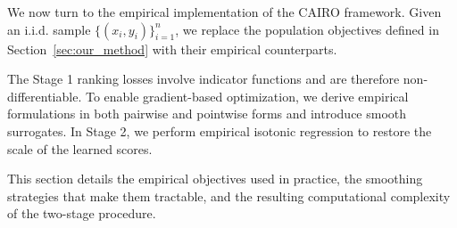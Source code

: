 \documentclass[11pt]{article}
\theoremstyle{plain}
\theoremstyle{plain}
\theoremstyle{plain}
\theoremstyle{plain}
\theoremstyle{plain}
\theoremstyle{plain}
\theoremstyle{plain}
\begin{document}
We now turn to the empirical implementation of the \textsc{CAIRO} framework. Given an i.i.d. sample $\{(x_i, y_i)\}_{i=1}^n$,  we replace the population objectives defined in Section~\ref{sec:our_method} with their empirical counterparts.

The Stage 1 ranking losses involve indicator functions and are therefore non-differentiable. To enable gradient-based optimization, we derive empirical formulations in both pairwise and pointwise forms and introduce smooth surrogates. In Stage 2, we perform empirical isotonic regression to restore the scale of the learned scores.

This section details the empirical objectives used in practice, the smoothing strategies that make them tractable, and the resulting computational complexity of the two-stage procedure.

\end{document}
